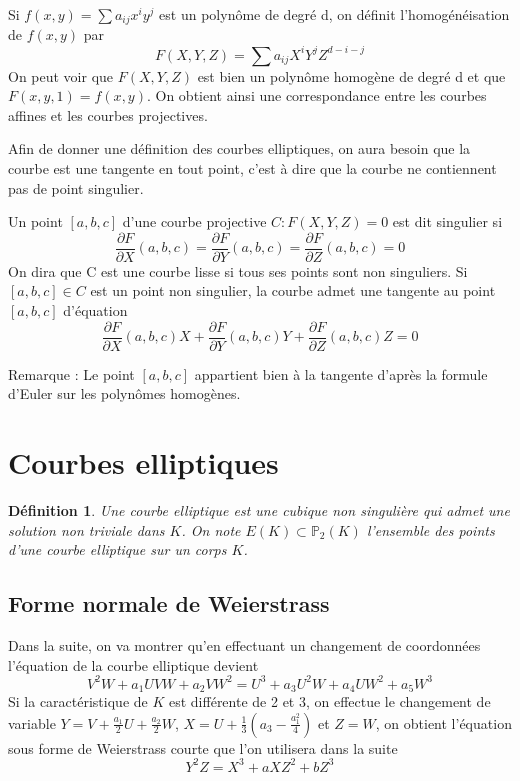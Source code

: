 \documentclass{article}
\newtheorem{definition}{Définition}
\begin{document}
Si $f(x,y) = \sum{a_{ij}x^{i}y^{j}}$ est un polynôme de degré d, on définit l'homogénéisation de $f(x,y)$ par
\begin{equation*}
F(X,Y,Z)=\sum{a_{ij}X^{i}Y^{j}Z^{d-i-j}}
\end{equation*}
On peut voir que $F(X,Y,Z)$ est bien un polynôme homogène de degré d et que $F(x,y,1)=f(x,y)$.
On obtient ainsi une correspondance entre les courbes affines et les courbes projectives.

Afin de donner une définition des courbes elliptiques, on aura besoin que la courbe est une tangente
en tout point, c'est à dire que la courbe ne contiennent pas de point singulier.

Un point $[a,b,c]$ d'une courbe projective $C: F(X,Y,Z)=0$ est dit singulier si
\begin{equation*}
\frac{\partial F}{\partial X}(a,b,c) = \frac{\partial F}{\partial Y}(a,b,c) = \frac{\partial F}{\partial Z}(a,b,c) = 0
\end{equation*}
On dira que C est une courbe lisse si tous ses points sont non singuliers. Si $[a,b,c]\in C$ est un point non singulier,
la courbe admet une tangente au point $[a,b,c]$ d'équation
\begin{equation*}
\frac{\partial F}{\partial X}(a,b,c)X + \frac{\partial F}{\partial Y}(a,b,c)Y + \frac{\partial F}{\partial Z}(a,b,c)Z = 0
\end{equation*}

Remarque : Le point $[a,b,c]$ appartient bien à la tangente d'après la formule d'Euler sur les polynômes homogènes.

\section{Courbes elliptiques}

\begin{definition}
Une courbe elliptique est une cubique non singulière qui admet une solution non triviale dans $K$.
On note $E(K) \subset \mathbb{P}_{2}(K)$ l'ensemble des points d'une courbe elliptique sur un corps $K$.
\end{definition}

\subsection{Forme normale de Weierstrass}
Dans la suite, on va montrer qu'en effectuant un changement de coordonnées l'équation de la courbe elliptique devient
\begin{equation*}
V^2W + a_{1}UVW + a_{2}VW^2 = U^3 + a_{3}U^2W + a_{4}UW^2 + a_{5}W^3
\end{equation*}
Si la caractéristique de $K$ est différente de 2 et 3, on effectue le changement de variable
$Y=V + \frac{a_{1}}{2}U + \frac{a_{2}}{2}W$, $X=U+\frac{1}{3}(a_{3}-\frac{a_{1}^2}{4})$ et $Z=W$,
on obtient l'équation sous forme de Weierstrass courte que l'on utilisera dans la suite
\begin{equation}
\label{Weier}
Y^2Z=X^3+aXZ^2+bZ^3
\end{equation}
\end{document}
